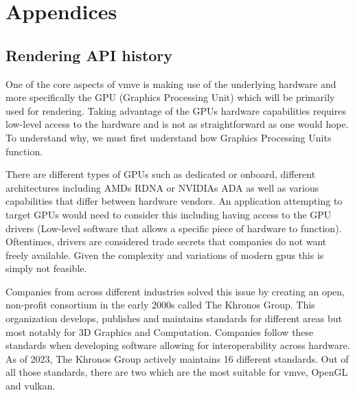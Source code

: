 \documentclass[11pt]{article}
\begin{document}


\clearpage
\printnoidxglossary

\clearpage
\printnoidxglossary[type=\acronymtype]

\clearpage



\clearpage
\section{Appendices}

\subsection{Rendering API history} \label{rendering_api_appendix}
One of the core aspects of \gls*{vmve} is making use of the underlying hardware and
more specifically the GPU (Graphics Processing Unit) which will be primarily
used for rendering. Taking advantage of the GPUs hardware capabilities requires
low-level access to the hardware and is not as straightforward as one would
hope. To understand why, we must first understand how Graphics Processing Units
function.

There are different types of GPUs such as dedicated or onboard, different
architectures including AMDs RDNA \cite{RDNA} or NVIDIAs ADA \cite{ADA} as well
as various capabilities that differ between hardware vendors. An application
attempting to target GPUs would need to consider this including having access to
the GPU drivers (Low-level software that allows a specific piece of hardware to
function). Oftentimes, drivers are considered trade secrets that companies do
not want freely available. Given the complexity and variations of modern
\glspl*{gpu} this is simply not feasible.

Companies from across different industries solved this issue by creating
an open, non-profit consortium in the early 2000s called The Khronos Group. This
organization develops, publishes and maintains standards for different areas
but most notably for 3D Graphics and Computation. Companies follow these 
standards when developing software allowing for interoperability across
hardware. As of 2023, The Khronos Group actively maintains 16 different
standards. Out of all those standards, there are two which are the most
suitable for \gls*{vmve}, OpenGL and \gls*{vulkan}.
\end{document}
